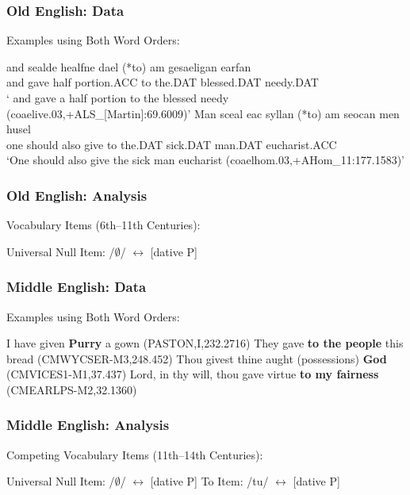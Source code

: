 \documentclass{beamer}
\begin{document}
\begin{frame}
	\frametitle{Old English: Data}
	\begin{exe}
		\ex Examples using Both Word Orders:
		\begin{xlist}
			\ex \gll and sealde healfne dael (*to) \TH am gesaeligan \TH earfan\\
			and gave half portion.ACC to the.DAT blessed.DAT needy.DAT\\
			\trans ` and gave a half portion to the blessed needy (coaelive.03,+ALS\_[Martin]:69.6009)'
			\ex \gll Man sceal eac syllan (*to) \TH am seocan men husel\\
			one should also give to the.DAT sick.DAT man.DAT eucharist.ACC\\
			\trans `One should also give the sick man eucharist (coaelhom.03,+AHom\_11:177.1583)'
		\end{xlist}
	\end{exe}
\end{frame}

\begin{frame}
	\frametitle{Old English: Analysis}
	\begin{exe}
		\ex Vocabulary Items (6th--11th Centuries):\label{ex:old-eng-vi}
		\begin{xlist}
			\ex Universal Null Item:  /$\emptyset$/ $\leftrightarrow$ [dative P]
		\end{xlist}
	\end{exe}
\end{frame}

\begin{frame}
	\frametitle{Middle English: Data}
	\begin{exe}
		\ex Examples using Both Word Orders:
		\begin{xlist}
		\ex I have given \textbf{Purry} a gown (PASTON,I,232.2716)
		\ex They gave \textbf{to the people} this bread (CMWYCSER-M3,248.452)\label{ex:mideng-rt-to}
		\ex Thou givest thine aught (possessions) \textbf{God} (CMVICES1-M1,37.437)
		\ex Lord, in thy will, thou gave virtue \textbf{to my fairness} (CMEARLPS-M2,32.1360)
	\end{xlist}
	\end{exe}
\end{frame}

\begin{frame}
	\frametitle{Middle English: Analysis}
	\begin{exe}
		\ex Competing Vocabulary Items (11th--14th Centuries):\label{ex:simple-vis-eng}
		\begin{xlist}
			\ex Universal Null Item: /$\emptyset$/ $\leftrightarrow$ [dative P]
			\ex To Item: /tu/ $\leftrightarrow$ [dative P]
		\end{xlist}
	\end{exe}
\end{frame}
\end{document}
